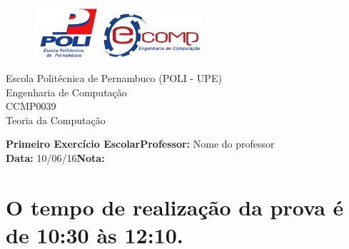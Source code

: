 \documentclass[12pt]{article}
\begin{document}
	
	\thispagestyle{empty}

	\begin{center}
		\begin{figure}[!htp]
		    {\includegraphics[scale=0.2, width=2.4cm]{../imagens/poli.png}}\hfill%
		    {\includegraphics[scale=0.3, width=3.7cm]{../imagens/ecomp.png}}%
  		\end{figure}
  		\begin{framed}
  			Escola Politécnica de Pernambuco (POLI - UPE) \\ Engenharia de Computação\\[0.2cm] \textsf{CCMP0039} \\ \textsf{Teoria da Computação}
  		\end{framed} 
	\end{center}
	
	\begin{flushleft}
		\textbf{Primeiro Exercício Escolar}\hspace{4.5cm}\textbf{Professor:} Nome do professor\\
		\textbf{Data:} 10/06/16\hspace{7.9cm}\textbf{Nota: }
		\begin{center}
			\hrulefill
		\end{center}
	\end{flushleft}

	\section*{\small{O tempo de realização da prova é de 10:30 às 12:10. }}
\end{document}
